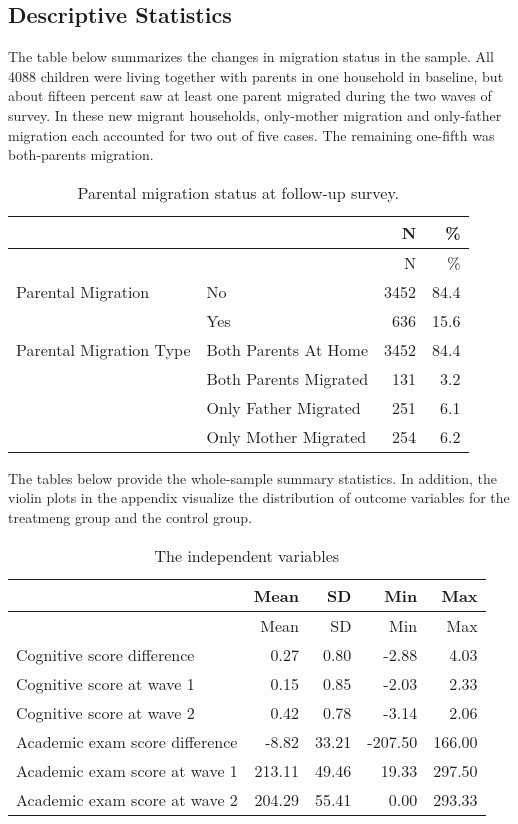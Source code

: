 \documentclass[
  man,floatsintext]{apa7}
\begin{document}
\hypertarget{descriptive-statistics}{%
\subsection{Descriptive Statistics}\label{descriptive-statistics}}

The table below summarizes the changes in migration status in the sample. All 4088 children were living together with parents in one household in baseline, but about fifteen percent saw at least one parent migrated during the two waves of survey. In these new migrant households, only-mother migration and only-father migration each accounted for two out of five cases. The remaining one-fifth was both-parents migration.

\begin{longtable}[]{@{}llrr@{}}
\caption{Parental migration status at follow-up survey.}\tabularnewline
\toprule
& & N & \% \\
\midrule
\endfirsthead
\toprule
& & N & \% \\
\midrule
\endhead
Parental Migration & No & 3452 & 84.4 \\
& Yes & 636 & 15.6 \\
Parental Migration Type & Both Parents At Home & 3452 & 84.4 \\
& Both Parents Migrated & 131 & 3.2 \\
& Only Father Migrated & 251 & 6.1 \\
& Only Mother Migrated & 254 & 6.2 \\
\bottomrule
\end{longtable}

The tables below provide the whole-sample summary statistics. In addition, the violin plots in the appendix visualize the distribution of outcome variables for the treatmeng group and the control group.

\begin{longtable}[]{@{}lrrrr@{}}
\caption{The independent variables}\tabularnewline
\toprule
& Mean & SD & Min & Max \\
\midrule
\endfirsthead
\toprule
& Mean & SD & Min & Max \\
\midrule
\endhead
Cognitive score difference & 0.27 & 0.80 & -2.88 & 4.03 \\
Cognitive score at wave 1 & 0.15 & 0.85 & -2.03 & 2.33 \\
Cognitive score at wave 2 & 0.42 & 0.78 & -3.14 & 2.06 \\
Academic exam score difference & -8.82 & 33.21 & -207.50 & 166.00 \\
Academic exam score at wave 1 & 213.11 & 49.46 & 19.33 & 297.50 \\
Academic exam score at wave 2 & 204.29 & 55.41 & 0.00 & 293.33 \\
\bottomrule
\end{longtable}
\end{document}
